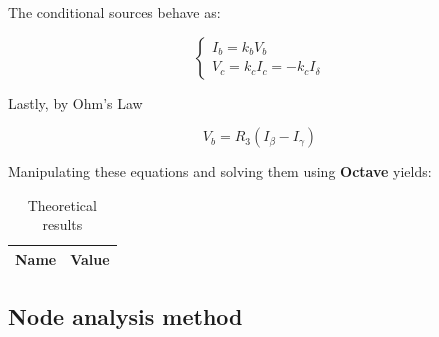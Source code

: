 The conditional sources behave as:

\begin{equation}
  \begin{cases}
  I_b = k_b V_b \\
  V_c = k_c I_c = - k_c I_\delta
  \end{cases}
\end{equation}

Lastly, by Ohm's Law

\begin{equation}
  V_b = R_3 (I_\beta - I_\gamma)
\end{equation}

Manipulating these equations and solving them using {\bf Octave} yields:



\begin{table}[H]
  \centering
  \begin{tabular}{|c|c|}
    \hline
        {\bf Name} & {\bf Value} \\
        \hline
        \hline
        
        \hline
  \end{tabular}
  \caption{Theoretical results}
  \label{mesh_res}
\end{table}    

\subsection{Node analysis method}

